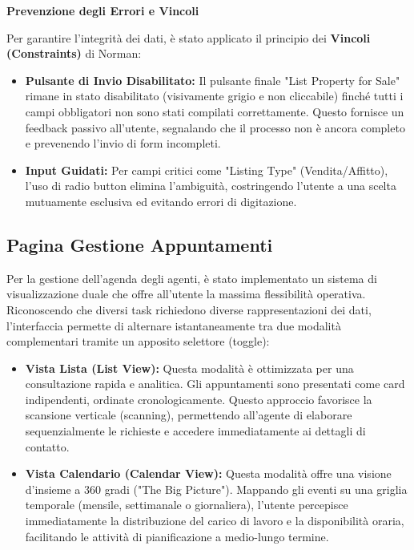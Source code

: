 \vspace{0.3cm}

\textbf{Prevenzione degli Errori e Vincoli}

Per garantire l'integrità dei dati, è stato applicato il principio dei \textbf{Vincoli (Constraints)} 
di Norman:

\begin{itemize}
    \item \textbf{Pulsante di Invio Disabilitato:} Il pulsante finale "List Property for Sale" rimane 
    in stato disabilitato (visivamente grigio e non cliccabile) finché tutti i campi obbligatori non 
    sono stati compilati correttamente. Questo fornisce un feedback passivo all'utente, segnalando 
    che il processo non è ancora completo e prevenendo l'invio di form incompleti.

    \item \textbf{Input Guidati:} Per campi critici come "Listing Type" (Vendita/Affitto), l'uso di 
    radio button elimina l'ambiguità, costringendo l'utente a una scelta mutuamente esclusiva ed 
    evitando errori di digitazione.
\end{itemize}

\subsection{Pagina Gestione Appuntamenti}

Per la gestione dell'agenda degli agenti, è stato implementato un sistema di visualizzazione duale 
che offre all'utente la massima flessibilità operativa. Riconoscendo che diversi task richiedono 
diverse rappresentazioni dei dati, l'interfaccia permette di alternare istantaneamente tra due 
modalità complementari tramite un apposito selettore (toggle):

\vspace{0.3cm}

\begin{itemize}
    \item \textbf{Vista Lista (List View):} Questa modalità è ottimizzata per una consultazione rapida 
    e analitica. Gli appuntamenti sono presentati come card indipendenti, ordinate cronologicamente. 
    Questo approccio favorisce la scansione verticale (scanning), permettendo all'agente di elaborare 
    sequenzialmente le richieste e accedere immediatamente ai dettagli di contatto.

    \item \textbf{Vista Calendario (Calendar View):} Questa modalità offre una visione d'insieme a 
    360 gradi ("The Big Picture"). Mappando gli eventi su una griglia temporale (mensile, settimanale 
    o giornaliera), l'utente percepisce immediatamente la distribuzione del carico di lavoro e la 
    disponibilità oraria, facilitando le attività di pianificazione a medio-lungo termine.
\end{itemize}


